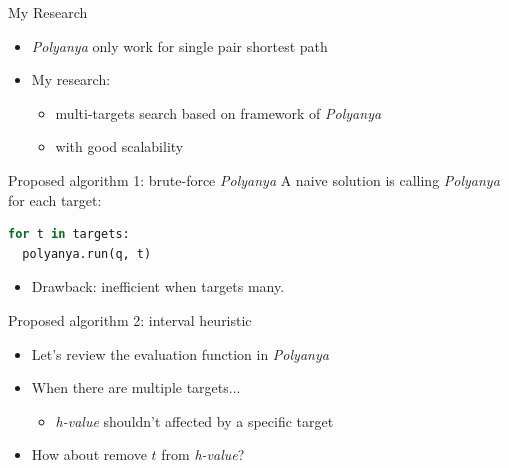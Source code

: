 \begin{frame}{My Research}
\begin{itemize}
    \item \small {\textit{Polyanya} only work for single pair shortest path}
    \item My research:
        \begin{itemize}
            \item \small{multi-targets search based on framework of \textit{Polyanya}}
            \item \small{with good scalability}
        \end{itemize}
\end{itemize}
\end{frame}

\begin{frame}[fragile]{Proposed algorithm 1: brute-force \textit{Polyanya}}
\small{A naive solution is calling \textit{Polyanya} for each target:}
\begin{lstlisting}[language=python]
for t in targets:
  polyanya.run(q, t)
\end{lstlisting}
\begin{itemize}
    \item<3->\small{Drawback: inefficient when targets many.}
\end{itemize}
\end{frame}

\begin{frame}{Proposed algorithm 2: interval heuristic}
\begin{minipage}{.6\textwidth}
\begin{itemize}
\item \small {Let's review the evaluation function in \textit{Polyanya}}
\item \small {When there are multiple targets...}
\begin{itemize}
    \item \small {\textit{h-value} shouldn't affected by a specific target}
\end{itemize}
\item \small {How about remove $t$ from \textit{h-value}}?
\end{itemize}
\end{minipage}%
\begin{minipage}{.4\textwidth}
    \begin{adjustbox}{max totalsize={.9\textwidth}{.9\textheight}, right}
    \end{adjustbox}
\end{minipage}
\end{frame}

